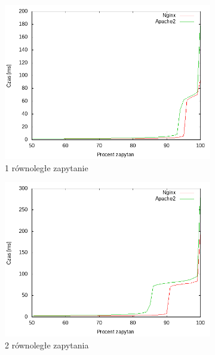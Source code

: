 \begin{figure}
	\centering
	\begin{subfigure}[h]{0.3\textwidth}
		\includegraphics[width=\textwidth]{testy/wybor_fib_15_1.png}
		\caption{1 równoległe zapytanie}
	\end{subfigure}
	\begin{subfigure}[h]{0.3\textwidth}
		\includegraphics[width=\textwidth]{testy/wybor_fib_15_2.png}
		\caption{2 równoległe zapytania}
	\end{subfigure}
	\begin{subfigure}[h]{0.3\textwidth}

\end{subfigure}
\end{figure}
